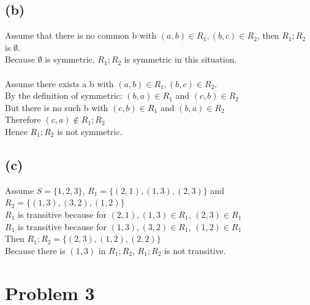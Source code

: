 \documentclass{article} %
\begin{document}
\subsection*{(b)}
Assume that there is no common b with $(a, b)\in R_1, (b, c)\in R_2$, then $R_1;R_2$ is $\emptyset$.\\
Because $\emptyset$ is symmetric, $R_1;R_2$ is symmetric in this situation.\\
\\
Assume there exists a b with $(a, b)\in R_1, (b, c)\in R_2$.\\
By the definition of symmetric: $(b, a)\in R_1$ and $(c, b)\in R_2$\\
But there is no such b with $(c, b) \in R_1$ and $(b, a) \in R_2$\\
Therefore $(c,a) \notin R_1;R_2$\\
Hence $R_1;R_2$ is not symmetric.\\

\subsection*{(c)}
Assume $S=\{1, 2, 3\}$, $R_1=\{(2, 1), (1, 3), (2, 3)\}$ and $R_2 = \{(1, 3), (3, 2), (1, 2)\}$\\
$R_1$ is transitive because for $(2, 1), (1, 3) \in R_1$, $(2, 3) \in R_1$\\
$R_1$ is transitive because for $(1, 3), (3, 2) \in R_1$, $(1, 2) \in R_1$\\
Then $R_1;R_2 = \{(2, 3), (1, 2), (2, 2)\}$\\
Because there is $(1, 3)$ in $R_1;R_2$, $R_1;R_2$ is not transitive. 

\section*{Problem 3}
\end{document}
